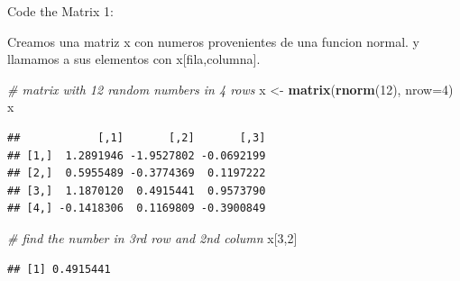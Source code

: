 \documentclass[ignorenonframetext,]{beamer}
\newenvironment{Shaded}{\begin{snugshade}}{\end{snugshade}}
\newcommand{\KeywordTok}[1]{\textcolor[rgb]{0.13,0.29,0.53}{\textbf{#1}}}
\newcommand{\DataTypeTok}[1]{\textcolor[rgb]{0.13,0.29,0.53}{#1}}
\newcommand{\DecValTok}[1]{\textcolor[rgb]{0.00,0.00,0.81}{#1}}
\newcommand{\StringTok}[1]{\textcolor[rgb]{0.31,0.60,0.02}{#1}}
\newcommand{\CommentTok}[1]{\textcolor[rgb]{0.56,0.35,0.01}{\textit{#1}}}
\newcommand{\NormalTok}[1]{#1}
\begin{document}
\begin{frame}[fragile]{Code the Matrix 1:}

Creamos una matriz x con numeros provenientes de una funcion normal. y
llamamos a sus elementos con x{[}fila,columna{]}.

\begin{Shaded}
\begin{Highlighting}[]
\CommentTok{# matrix with 12 random numbers in 4 rows}
\NormalTok{x <-}\StringTok{ }\KeywordTok{matrix}\NormalTok{(}\KeywordTok{rnorm}\NormalTok{(}\DecValTok{12}\NormalTok{), }\DataTypeTok{nrow=}\DecValTok{4}\NormalTok{)}
\NormalTok{x }
\end{Highlighting}
\end{Shaded}

\begin{verbatim}
##            [,1]       [,2]       [,3]
## [1,]  1.2891946 -1.9527802 -0.0692199
## [2,]  0.5955489 -0.3774369  0.1197222
## [3,]  1.1870120  0.4915441  0.9573790
## [4,] -0.1418306  0.1169809 -0.3900849
\end{verbatim}

\begin{Shaded}
\begin{Highlighting}[]
\CommentTok{# find the number in 3rd row and 2nd column}
\NormalTok{x[}\DecValTok{3}\NormalTok{,}\DecValTok{2}\NormalTok{]}
\end{Highlighting}
\end{Shaded}

\begin{verbatim}
## [1] 0.4915441
\end{verbatim}

\end{frame}
\end{document}
